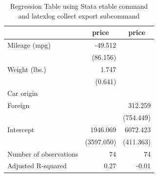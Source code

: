 \documentclass{article}
\begin{document}
\begin{table}[htbp] 
\centering 
\caption{Regression Table using Stata etable command and latexlog collect export subcommand} 

\centering
\begin{tabular}{lll}
\toprule
\multicolumn{1}{r}{} &
  \multicolumn{1}{c}{price} &
  \multicolumn{1}{c}{price} \\
\midrule
\multicolumn{1}{l}{Mileage (mpg)} &
  \multicolumn{1}{r}{-49.512} &
  \multicolumn{1}{r}{} \\
\multicolumn{1}{l}{} &
  \multicolumn{1}{r}{(86.156)} &
  \multicolumn{1}{r}{} \\
\multicolumn{1}{l}{Weight (lbs.)} &
  \multicolumn{1}{r}{1.747} &
  \multicolumn{1}{r}{} \\
\multicolumn{1}{l}{} &
  \multicolumn{1}{r}{(0.641)} &
  \multicolumn{1}{r}{} \\
\multicolumn{1}{l}{Car origin} &
  \multicolumn{1}{r}{} &
  \multicolumn{1}{r}{} \\
\multicolumn{1}{l}{\hspace{1em}Foreign} &
  \multicolumn{1}{r}{} &
  \multicolumn{1}{r}{312.259} \\
\multicolumn{1}{l}{} &
  \multicolumn{1}{r}{} &
  \multicolumn{1}{r}{(754.449)} \\
\multicolumn{1}{l}{Intercept} &
  \multicolumn{1}{r}{1946.069} &
  \multicolumn{1}{r}{6072.423} \\
\multicolumn{1}{l}{} &
  \multicolumn{1}{r}{(3597.050)} &
  \multicolumn{1}{r}{(411.363)} \\
\multicolumn{1}{l}{Number of observations} &
  \multicolumn{1}{r}{74} &
  \multicolumn{1}{r}{74} \\
\multicolumn{1}{l}{Adjusted R-squared} &
  \multicolumn{1}{r}{0.27} &
  \multicolumn{1}{r}{-0.01} \\
\bottomrule
\end{tabular}

\end{table}
\end{document}
